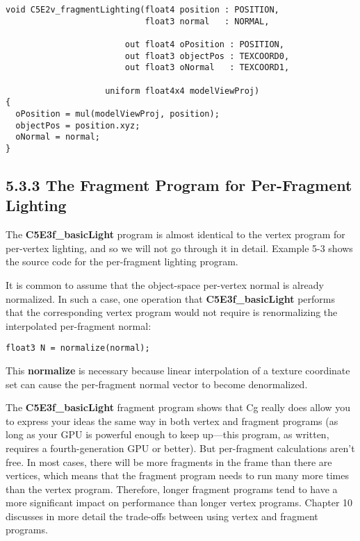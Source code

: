 \documentclass[../main.tex]{subfiles}
\begin{document}
\FloatBarrier
\begin{lstlisting}[caption=Example 5-2. The \textbf{C5E2v_fragmentLighting} Vertex Program]
void C5E2v_fragmentLighting(float4 position : POSITION,
                            float3 normal   : NORMAL,

                        out float4 oPosition : POSITION,
                        out float3 objectPos : TEXCOORD0,
                        out float3 oNormal   : TEXCOORD1,

                    uniform float4x4 modelViewProj)
{
  oPosition = mul(modelViewProj, position);
  objectPos = position.xyz;
  oNormal = normal;
}
\end{lstlisting}
\FloatBarrier

\subsection{5.3.3 The Fragment Program for Per-Fragment Lighting}

The \textbf{C5E3f_basicLight} program is almost identical to the vertex program for per-vertex lighting, and so we will not go through it in detail. Example 5-3 shows the source code for the per-fragment lighting program.

It is common to assume that the object-space per-vertex normal is already normalized. In such a case, one operation that \textbf{C5E3f_basicLight} performs that the corresponding vertex program would not require is renormalizing the interpolated per-fragment normal:

\FloatBarrier
\begin{lstlisting}
float3 N = normalize(normal);
\end{lstlisting}
\FloatBarrier

This \textbf{normalize} is necessary because linear interpolation of a texture coordinate set can cause the per-fragment normal vector to become denormalized.

The \textbf{C5E3f_basicLight} fragment program shows that Cg really does allow you to express your ideas the same way in both vertex and fragment programs (as long as your GPU is powerful enough to keep up—this program, as written, requires a fourth-generation GPU or better). But per-fragment calculations aren't free. In most cases, there will be more fragments in the frame than there are vertices, which means that the fragment program needs to run many more times than the vertex program. Therefore, longer fragment programs tend to have a more significant impact on performance than longer vertex programs. Chapter 10 discusses in more detail the trade-offs between using vertex and fragment programs.
\end{document}
